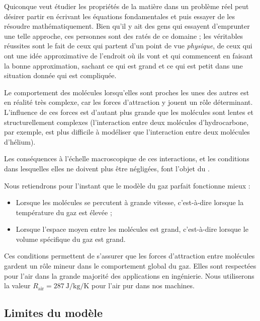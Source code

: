 			Quiconque veut étudier les propriétés de la matière dans un problème réel peut désirer partir en écrivant les équations fondamentales et puis essayer de les résoudre mathématiquement. Bien qu’il y ait des gens qui essayent d’emprunter une telle approche, ces personnes sont des ratés de ce domaine ; les véritables réussites sont le fait de ceux qui partent d’un point de vue \emph{physique}, de ceux qui ont une idée approximative de l’endroit où ils vont et qui commencent en faisant la bonne approximation, sachant ce qui est grand et ce qui est petit dans une situation donnée qui est compliquée.
	
		Le comportement des molécules lorsqu’elles sont proches les unes des autres est en réalité très complexe, car les forces d’attraction y jouent un rôle déterminant. L’influence de ces forces est d’autant plus grande que les molécules sont lentes et structurellement complexes (l’interaction entre deux molécules d’hydrocarbone, par exemple, est plus difficile à modéliser que l’interaction entre deux molécules d’hélium).

		Les conséquences à l’échelle macroscopique de ces interactions, et les conditions dans lesquelles elles ne doivent plus être négligées, font l’objet du \courscinq.

		Nous retiendrons pour l’instant que le modèle du gaz parfait fonctionne mieux :

		\begin{itemize}
			\item Lorsque les molécules se percutent à grande vitesse, c’est-à-dire lorsque la température du gaz est élevée ;
			\item Lorsque l’espace moyen entre les molécules est grand, c’est-à-dire lorsque le volume spécifique du gaz est grand.
		\end{itemize}
		
		Ces conditions permettent de s’assurer que les forces d’attraction entre molécules gardent un rôle mineur dans le comportement global du gaz. Elles sont respectées pour l’air dans la grande majorité des applications en ingénierie. Nous utiliserons la valeur $R_\text{air} = \SI{287}{\joule\per\kilogram\per\kelvin}$ pour l’air pur dans nos machines.


	\subsection{Limites du modèle}

